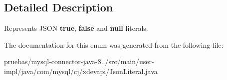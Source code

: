 \subsection{Detailed Description}
Represents J\+S\+ON {\bfseries true}, {\bfseries false} and {\bfseries null} literals. 

The documentation for this enum was generated from the following file\+:\begin{DoxyCompactItemize}
\item 
pruebas/mysql-\/connector-\/java-\/8../src/main/user-\/impl/java/com/mysql/cj/xdevapi/Json\+Literal.\+java\end{DoxyCompactItemize}
